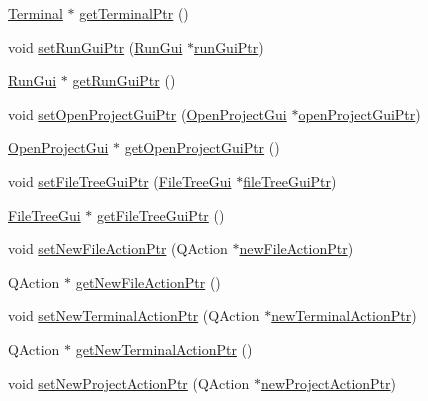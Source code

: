 \begin{DoxyCompactItemize}
\item 
\hyperlink{class_terminal}{Terminal} $\ast$ \hyperlink{class_master_actions_aed6c3f33a2f6f7a97d2006299d861269}{get\-Terminal\-Ptr} ()
\item 
void \hyperlink{class_master_actions_a67bf77b969dcbe752434110c8163d792}{set\-Run\-Gui\-Ptr} (\hyperlink{class_run_gui}{Run\-Gui} $\ast$\hyperlink{class_master_actions_ad7ff295f2e3067697e290afc4f0fd0df}{run\-Gui\-Ptr})
\item 
\hyperlink{class_run_gui}{Run\-Gui} $\ast$ \hyperlink{class_master_actions_a056278722ed1dbe98df15d1d073454bc}{get\-Run\-Gui\-Ptr} ()
\item 
void \hyperlink{class_master_actions_afc72dd08b2b6c8c25b8c4650b0446172}{set\-Open\-Project\-Gui\-Ptr} (\hyperlink{class_open_project_gui}{Open\-Project\-Gui} $\ast$\hyperlink{class_master_actions_a6caf7325dd9cb26f72c81a8c877db634}{open\-Project\-Gui\-Ptr})
\item 
\hyperlink{class_open_project_gui}{Open\-Project\-Gui} $\ast$ \hyperlink{class_master_actions_ab70b9336f1785ba7759b393d0b6a41db}{get\-Open\-Project\-Gui\-Ptr} ()
\item 
void \hyperlink{class_master_actions_a3db6de1dd67b2c023cbc3c39f25073ca}{set\-File\-Tree\-Gui\-Ptr} (\hyperlink{class_file_tree_gui}{File\-Tree\-Gui} $\ast$\hyperlink{class_master_actions_a53d5e999ea25b0d3d1643fca709f3bcb}{file\-Tree\-Gui\-Ptr})
\item 
\hyperlink{class_file_tree_gui}{File\-Tree\-Gui} $\ast$ \hyperlink{class_master_actions_a5a91b56205eaec39af7c913ec721da43}{get\-File\-Tree\-Gui\-Ptr} ()
\item 
void \hyperlink{class_master_actions_a4af05020cee8c5e80df586b03c20e765}{set\-New\-File\-Action\-Ptr} (Q\-Action $\ast$\hyperlink{class_master_actions_a4da658e527460b8d5b0a263820259e97}{new\-File\-Action\-Ptr})
\item 
Q\-Action $\ast$ \hyperlink{class_master_actions_a0ef76147044b06c8b951534a0d7ab7f2}{get\-New\-File\-Action\-Ptr} ()
\item 
void \hyperlink{class_master_actions_afe72189da4d2c5657f20d51fbcf6a62c}{set\-New\-Terminal\-Action\-Ptr} (Q\-Action $\ast$\hyperlink{class_master_actions_a6c3b1d9319fbf23f5a7cbe8305e16fc1}{new\-Terminal\-Action\-Ptr})
\item 
Q\-Action $\ast$ \hyperlink{class_master_actions_ae9f9f04302be1d7dc9fe902fc2597a1b}{get\-New\-Terminal\-Action\-Ptr} ()
\item 
void \hyperlink{class_master_actions_a4d6a5bfbd44ebe419d7cfa8295a54a39}{set\-New\-Project\-Action\-Ptr} (Q\-Action $\ast$\hyperlink{class_master_actions_a114ab55c27fc183af68ebaaa86748a82}{new\-Project\-Action\-Ptr})

\end{DoxyCompactItemize}
